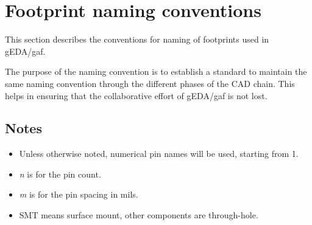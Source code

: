 \documentclass{article}
\begin{document}
\section{Footprint naming conventions}

This section describes the conventions for naming of footprints used in
gEDA/gaf. 

The purpose of the naming convention is to establish a standard to
maintain the same naming convention through the different phases of the 
CAD chain. This helps in ensuring that the collaborative effort of gEDA/gaf 
is not lost.

\subsection{Notes}
\begin{itemize}
\item  Unless otherwise noted, numerical pin names will be used,
       starting from 1.
\item  {\it n} is for the pin count.
\item  {\it m} is for the pin spacing in mils.
\item  SMT means surface mount, other components are through-hole.
\end{itemize}
\end{document}
